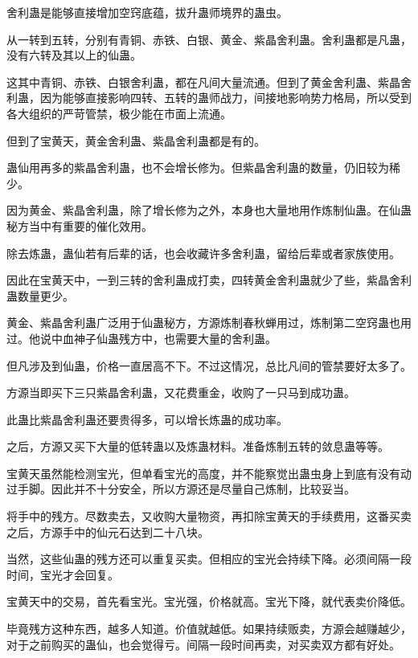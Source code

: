 
\begin{this_body}



舍利蛊是能够直接增加空窍底蕴，拔升蛊师境界的蛊虫。

从一转到五转，分别有青铜、赤铁、白银、黄金、紫晶舍利蛊。舍利蛊都是凡蛊，没有六转及其以上的仙蛊。

这其中青铜、赤铁、白银舍利蛊，都在凡间大量流通。但到了黄金舍利蛊、紫晶舍利蛊，因为能够直接影响四转、五转的蛊师战力，间接地影响势力格局，所以受到各大组织的严苛管禁，极少能在市面上流通。

但到了宝黄天，黄金舍利蛊、紫晶舍利蛊都是有的。

蛊仙用再多的紫晶舍利蛊，也不会增长修为。但紫晶舍利蛊的数量，仍旧较为稀少。

因为黄金、紫晶舍利蛊，除了增长修为之外，本身也大量地用作炼制仙蛊。在仙蛊秘方当中有重要的催化效用。

除去炼蛊，蛊仙若有后辈的话，也会收藏许多舍利蛊，留给后辈或者家族使用。

因此在宝黄天中，一到三转的舍利蛊成打卖，四转黄金舍利蛊就少了些，紫晶舍利蛊数量更少。

黄金、紫晶舍利蛊广泛用于仙蛊秘方，方源炼制春秋蝉用过，炼制第二空窍蛊也用过。他说中血神子仙蛊残方中，也需要大量的舍利蛊。

但凡涉及到仙蛊，价格一直居高不下。不过这情况，总比凡间的管禁要好太多了。

方源当即买下三只紫晶舍利蛊，又花费重金，收购了一只马到成功蛊。

此蛊比紫晶舍利蛊还要贵得多，可以增长炼蛊的成功率。

之后，方源又买下大量的低转蛊以及炼蛊材料。准备炼制五转的敛息蛊等等。

宝黄天虽然能检测宝光，但单看宝光的高度，并不能察觉出蛊虫身上到底有没有动过手脚。因此并不十分安全，所以方源还是尽量自己炼制，比较妥当。

将手中的残方。尽数卖去，又收购大量物资，再扣除宝黄天的手续费用，这番买卖之后，方源手中的仙元石达到二十八块。

当然，这些仙蛊的残方还可以重复买卖。但相应的宝光会持续下降。必须间隔一段时间，宝光才会回复。

宝黄天中的交易，首先看宝光。宝光强，价格就高。宝光下降，就代表卖价降低。

毕竟残方这种东西，越多人知道。价值就越低。如果持续贩卖，方源会越赚越少，对于之前购买的蛊仙，也会觉得亏。间隔一段时间再卖，对买卖双方都有好处。


\end{this_body}
